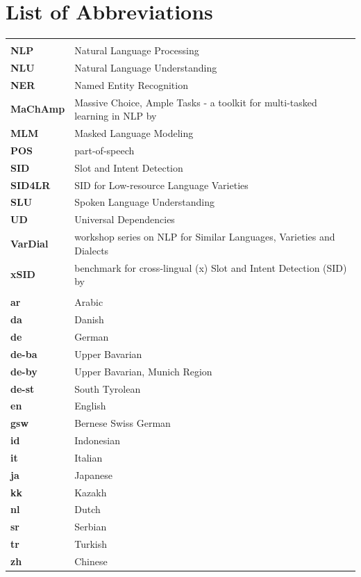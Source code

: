 \documentclass[11pt,a4paper,twoside,openright]{scrbook}
\begin{document}
\chapter*{List of Abbreviations}

\begin{table}[!ht]
\raggedright
\renewcommand{\arraystretch}{1.3} %
\setlength{\tabcolsep}{10pt} %
\normalsize
\begin{tabular}{>{\bfseries}p{} p{}}
\multicolumn{2}{l}{\Large \textbf{\rule[-0.5em]{0pt}{2em}General Abbreviations}} \\ 

NLP & Natural Language Processing \\
NLU & Natural Language Understanding \\
NER & Named Entity Recognition \\
MaChAmp & Massive Choice, Ample Tasks - a toolkit for multi-tasked learning in NLP by \citet{van-der-goot-etal-2021-massive} \\
MLM & Masked Language Modeling \\
POS & part-of-speech \\
SID & Slot and Intent Detection \\
SID4LR & SID for Low-resource Language Varieties \\
SLU & Spoken Language Understanding \\
UD & Universal Dependencies \\
VarDial & workshop series on NLP for Similar Languages, Varieties and Dialects \citep{2023-findings-vardial} \\
xSID & benchmark for cross-lingual (x) Slot and Intent Detection (SID) by \citet{van-der-goot-etal-2021-masked} \\

\multicolumn{2}{l}{\Large \textbf{\rule[-0.5em]{0pt}{2em}Language Abbreviations}} \\ 
ar & Arabic \\
da & Danish \\
de & German \\
de-ba & Upper Bavarian \\
de-by & Upper Bavarian, Munich Region\\
de-st & South Tyrolean\\
en & English \\
gsw & Bernese Swiss German \\
id & Indonesian \\
it & Italian \\
ja & Japanese \\
kk & Kazakh \\
nl & Dutch \\
sr & Serbian \\
tr & Turkish \\
zh & Chinese \\

\end{tabular}
\label{tab:general_abbreviations}
\end{table}
\end{document}
